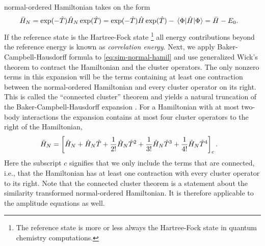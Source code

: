             normal-ordered Hamiltonian takes on the form
            \begin{align}
                \simhamil_N
                &=
                \exponential(-\clust)
                \hamil_N
                \exponential(\clust)
                =
                \exponential(-\clust)
                \hamil
                \exponential(\clust)
                - \mel*{\slat}{\hamil}{\slat}
                = \simhamil - \energyref.
                \label{eq:sim-normal-hamil}
            \end{align}
            If the reference state is the Hartree-Fock state%
            \footnote{
                The reference state is more or less always the Hartree-Fock
                state in quantum chemistry computations.
            }
            all energy contributions beyond the reference energy is known as
            \emph{correlation energy}.
            Next, we apply Baker-Campbell-Hausdorff formula to
            \autoref{eq:sim-normal-hamil} and use generalized Wick's theorem to
            contract the Hamiltonian and the cluster operators.
            The only nonzero terms in this expansion will be the terms
            containing at least one contraction between the normal-ordered
            Hamiltonian and every cluster operator on its right.
            This is called the ``connected cluster'' theorem and yields a
            natural truncation of the Baker-Campbell-Hausdorff expansion
            \cite{crawford2000introduction, shavitt2009many}.
            For a Hamiltonian with at most two-body interactions the expansion
            contains at most four cluster operators to the right of the
            Hamiltonian,
            \begin{align}
                \bar{H}_N
                &=
                \left[ 
                    \hat{H}_N
                    + \hat{H}_N \hat{T}
                    + \frac{1}{2!} \hat{H}_N \hat{T}^2
                    + \frac{1}{3!} \hat{H}_N \hat{T}^3
                    + \frac{1}{4!} \hat{H}_N \hat{T}^4
                 \right]_c.
                \label{eq:connected-hamil}
            \end{align}
            Here the subscript $c$ signifies that we only include the terms that
            are connected, i.e., that the Hamiltonian has at least one
            contraction with every cluster operator to its right.
            Note that the connected cluster theorem is a statement about the
            similarity transformed normal-ordered Hamiltonian.
            It is therefore applicable to the amplitude equations as well.

